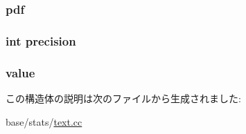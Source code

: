 \label{structStats_1_1ScalarPrint_a8ccf841cb59e451791bcb2e1ac4f1edc}
\hypertarget{structStats_1_1ScalarPrint_aa46e8ac10e602fadd5fcc255eb438647}{
\subsubsection[{pdf}]{ {\bf pdf}}}
\label{structStats_1_1ScalarPrint_aa46e8ac10e602fadd5fcc255eb438647}
\hypertarget{structStats_1_1ScalarPrint_aa95455ed52a8459fad69509a4a0411b5}{
\subsubsection[{precision}]{\setlength{\rightskip}{0pt plus 5cm}int {\bf precision}}}
\label{structStats_1_1ScalarPrint_aa95455ed52a8459fad69509a4a0411b5}
\hypertarget{structStats_1_1ScalarPrint_abc7841b7d107d40bf18692982c1a8f6f}{
\subsubsection[{value}]{ {\bf value}}}
\label{structStats_1_1ScalarPrint_abc7841b7d107d40bf18692982c1a8f6f}


この構造体の説明は次のファイルから生成されました:\begin{DoxyCompactItemize}
\item 
base/stats/\hyperlink{text_8cc}{text.cc}\end{DoxyCompactItemize}
